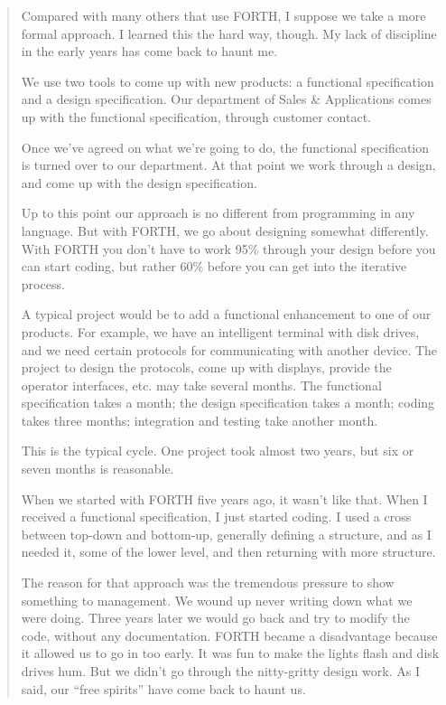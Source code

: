 \begin{quotation}
\noindent Compared with many others that use FORTH, I suppose we take a more
formal approach. I learned this the hard way, though. My lack of discipline
in the early years has come back to haunt me.

\noindent We use two tools to come up with new products: a functional specification
and a design specification. Our department of Sales \& Applications comes
up with the functional specification, through customer contact.

\noindent Once we've agreed on what we're going to do, the functional specification is
turned over to our department. At that point we work through a design,
and come up with the design specification.

\noindent Up to this point our approach is no different from programming in any
language. But with FORTH, we go about designing somewhat differently.
With FORTH you don't have to work 95\% through your design before you
can start coding, but rather 60\% before you can get into the iterative
process.


\noindent A typical project would be to add a functional enhancement to one of our
products. For example, we have an intelligent terminal with disk drives,
and we need certain protocols for communicating with another device. The
project to design the protocols, come up with displays, provide the operator
interfaces, etc. may take several months. The functional specification takes
a month; the design specification takes a month; coding takes three
months; integration and testing take another month.

\noindent This is the typical cycle. One project took almost two years, but six or
seven months is reasonable.

\noindent When we started with FORTH five years ago, it wasn't like that. When I
received a functional specification, I just started coding. I used a cross
between top-down and bottom-up, generally defining a structure, and as I
needed it, some of the lower level, and then returning with more structure.

\noindent The reason for that approach was the tremendous pressure to show
something to management. We wound up never writing down what we were
doing. Three years later we would go back and try to modify the code,
without any documentation. FORTH became a disadvantage because it
allowed us to go in too early. It was fun to make the lights flash and disk
drives hum. But we didn't go through the nitty-gritty design work. As I
said, our ``free spirits'' have come back to haunt us.


\end{quotation}
